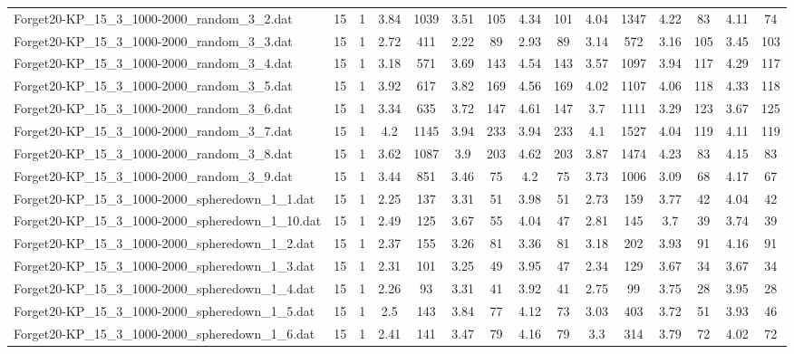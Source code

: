 \begin{table}[!ht]
{\begin{tabular}{lcccccccccccccc}
Forget20-KP\_15\_3\_1000-2000\_random\_3\_2.dat & 15 & 1 & 3.84 & 1039 & 3.51 & 105 & 4.34 & 101 & 4.04 & 1347 & 4.22 & 83 & 4.11 & 74 \\
Forget20-KP\_15\_3\_1000-2000\_random\_3\_3.dat & 15 & 1 & 2.72 & 411 & 2.22 & 89 & 2.93 & 89 & 3.14 & 572 & 3.16 & 105 & 3.45 & 103 \\
Forget20-KP\_15\_3\_1000-2000\_random\_3\_4.dat & 15 & 1 & 3.18 & 571 & 3.69 & 143 & 4.54 & 143 & 3.57 & 1097 & 3.94 & 117 & 4.29 & 117 \\
Forget20-KP\_15\_3\_1000-2000\_random\_3\_5.dat & 15 & 1 & 3.92 & 617 & 3.82 & 169 & 4.56 & 169 & 4.02 & 1107 & 4.06 & 118 & 4.33 & 118 \\
Forget20-KP\_15\_3\_1000-2000\_random\_3\_6.dat & 15 & 1 & 3.34 & 635 & 3.72 & 147 & 4.61 & 147 & 3.7 & 1111 & 3.29 & 123 & 3.67 & 125 \\
Forget20-KP\_15\_3\_1000-2000\_random\_3\_7.dat & 15 & 1 & 4.2 & 1145 & 3.94 & 233 & 3.94 & 233 & 4.1 & 1527 & 4.04 & 119 & 4.11 & 119 \\
Forget20-KP\_15\_3\_1000-2000\_random\_3\_8.dat & 15 & 1 & 3.62 & 1087 & 3.9 & 203 & 4.62 & 203 & 3.87 & 1474 & 4.23 & 83 & 4.15 & 83 \\
Forget20-KP\_15\_3\_1000-2000\_random\_3\_9.dat & 15 & 1 & 3.44 & 851 & 3.46 & 75 & 4.2 & 75 & 3.73 & 1006 & 3.09 & 68 & 4.17 & 67 \\
Forget20-KP\_15\_3\_1000-2000\_spheredown\_1\_1.dat & 15 & 1 & 2.25 & 137 & 3.31 & 51 & 3.98 & 51 & 2.73 & 159 & 3.77 & 42 & 4.04 & 42 \\
Forget20-KP\_15\_3\_1000-2000\_spheredown\_1\_10.dat & 15 & 1 & 2.49 & 125 & 3.67 & 55 & 4.04 & 47 & 2.81 & 145 & 3.7 & 39 & 3.74 & 39 \\
Forget20-KP\_15\_3\_1000-2000\_spheredown\_1\_2.dat & 15 & 1 & 2.37 & 155 & 3.26 & 81 & 3.36 & 81 & 3.18 & 202 & 3.93 & 91 & 4.16 & 91 \\
Forget20-KP\_15\_3\_1000-2000\_spheredown\_1\_3.dat & 15 & 1 & 2.31 & 101 & 3.25 & 49 & 3.95 & 47 & 2.34 & 129 & 3.67 & 34 & 3.67 & 34 \\
Forget20-KP\_15\_3\_1000-2000\_spheredown\_1\_4.dat & 15 & 1 & 2.26 & 93 & 3.31 & 41 & 3.92 & 41 & 2.75 & 99 & 3.75 & 28 & 3.95 & 28 \\
Forget20-KP\_15\_3\_1000-2000\_spheredown\_1\_5.dat & 15 & 1 & 2.5 & 143 & 3.84 & 77 & 4.12 & 73 & 3.03 & 403 & 3.72 & 51 & 3.93 & 46 \\
Forget20-KP\_15\_3\_1000-2000\_spheredown\_1\_6.dat & 15 & 1 & 2.41 & 141 & 3.47 & 79 & 4.16 & 79 & 3.3 & 314 & 3.79 & 72 & 4.02 & 72 \\

\end{tabular}}
\end{table}
